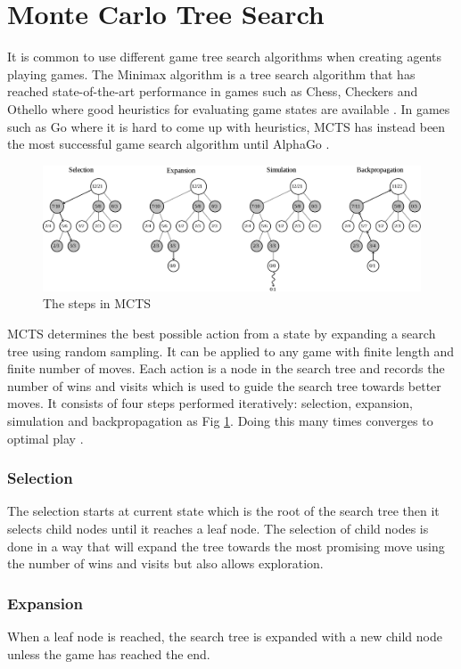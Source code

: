\documentclass{kththesis}
\begin{document}
\section{Monte Carlo Tree Search}
It is common to use different game tree search algorithms when creating agents playing games. The Minimax algorithm is a tree search algorithm that has reached state-of-the-art performance in games such as Chess, Checkers and Othello where good heuristics for evaluating game states are available \cite{alphaGo2016}. In games such as Go where it is hard to come up with heuristics, MCTS has instead been the most successful game search algorithm until AlphaGo \cite{goMoveEvaluation2014}.

\begin{figure}
\includegraphics[width=\textwidth]{images/mcst.png}
\caption{The steps in MCTS}
\label{fig:mcts-steps}
\end{figure}

MCTS determines the best possible action from a state by expanding a search tree using random sampling. It can be applied to any game with finite length and finite number of moves. Each action is a node in the search tree and records the number of wins and visits which is used to guide the search tree towards better moves. It consists of four steps performed iteratively: selection, expansion, simulation and backpropagation as Fig \ref{fig:mcts-steps}. Doing this many times converges to optimal play \cite{kocsis2006bandit}.

\subsubsection{Selection}
The selection starts at current state which is the root of the search tree then it selects child nodes until it reaches a leaf node. The selection of child nodes is done in a way that will expand the tree towards the most promising move using the number of wins and visits but also allows exploration.

\subsubsection{Expansion}
When a leaf node is reached, the search tree is expanded with a new child node unless the game has reached the end.
\end{document}
